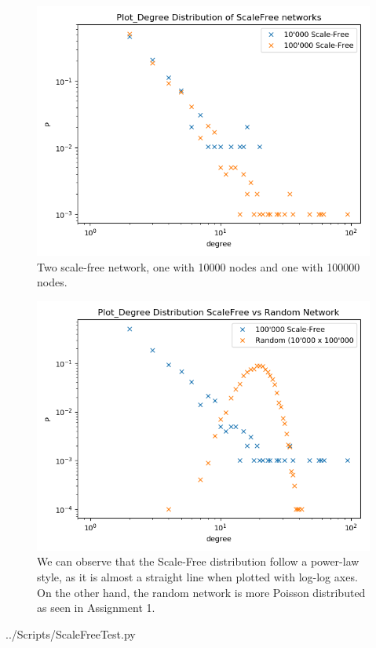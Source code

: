 \documentclass[10pt,a4paper]{article}
\begin{document}
\begin{enumerate}

\begin{figure}[H]
	\centering
	\includegraphics[width=0.7\linewidth]{"../Scripts/Plot_Degree Distribution of ScaleFree networks"}
	\caption{Two scale-free network, one with 10000 nodes and one with 100000 nodes.}
	\label{fig:plotdegree-distribution-of-scalefree-networks}
\end{figure}



\begin{figure}[H]
	\centering
	\includegraphics[width=0.7\linewidth]{"../Scripts/Plot_Degree Distribution ScaleFree vs Random Network"}
	\caption[Scale-Free vs Random]{We can observe that the Scale-Free distribution follow a power-law style, as it is almost a straight line when plotted with log-log axes. On the other hand, the random network is more Poisson distributed as seen in Assignment 1.}
	\label{fig:plot2degree-distribution-scalefree-vs-random-network}
\end{figure}



 {../Scripts/ScaleFreeTest.py}


\end{enumerate}
\end{document}
